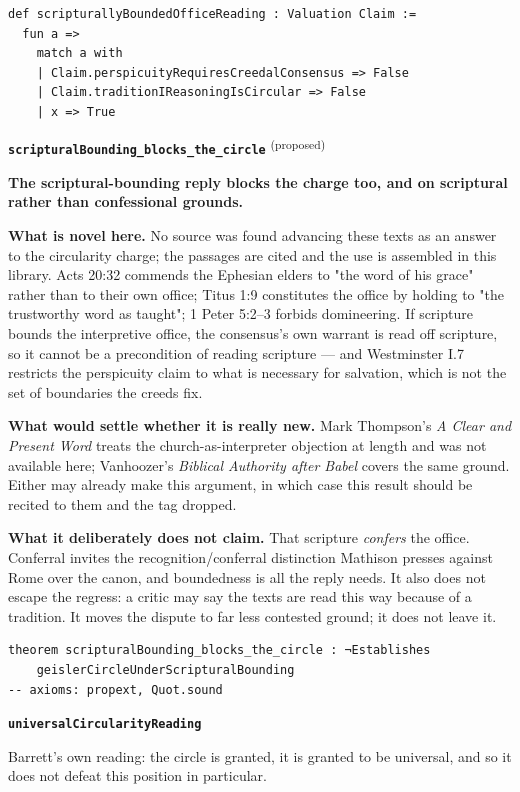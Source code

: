 \documentclass[11pt]{article}
\begin{document}
{\small\begin{verbatim}
def scripturallyBoundedOfficeReading : Valuation Claim :=
  fun a =>
    match a with
    | Claim.perspicuityRequiresCreedalConsensus => False
    | Claim.traditionIReasoningIsCircular => False
    | x => True
\end{verbatim}}
\par\medskip\noindent\textbf{\texttt{scriptural\allowbreak{}Bounding\_\allowbreak{}blocks\_\allowbreak{}the\_\allowbreak{}circle}} \textsuperscript{(proposed)}\par\nobreak\noindent
\textbf{The scriptural-bounding reply blocks the charge too, and on scriptural rather than confessional grounds.}

\textbf{What is novel here.} No source was found advancing these texts as an answer to the circularity charge; the passages are cited and the use is assembled in this library. Acts 20:32 commends the Ephesian elders to "the word of his grace" rather than to their own office; Titus 1:9 constitutes the office by holding to "the trustworthy word as taught"; 1 Peter 5:2–3 forbids domineering. If scripture bounds the interpretive office, the consensus's own warrant is read off scripture, so it cannot be a precondition of reading scripture — and Westminster I.7 restricts the perspicuity claim to what is necessary for salvation, which is not the set of boundaries the creeds fix.

\textbf{What would settle whether it is really new.} Mark Thompson's \emph{A Clear and Present Word} treats the church-as-interpreter objection at length and was not available here; Vanhoozer's \emph{Biblical Authority after Babel} covers the same ground. Either may already make this argument, in which case this result should be recited to them and the tag dropped.

\textbf{What it deliberately does not claim.} That scripture \emph{confers} the office. Conferral invites the recognition/conferral distinction Mathison presses against Rome over the canon, and boundedness is all the reply needs. It also does not escape the regress: a critic may say the texts are read this way because of a tradition. It moves the dispute to far less contested ground; it does not leave it.

{\small\begin{verbatim}
theorem scripturalBounding_blocks_the_circle : ¬Establishes
    geislerCircleUnderScripturalBounding
-- axioms: propext, Quot.sound
\end{verbatim}}
\par\medskip\noindent\textbf{\texttt{universal\allowbreak{}Circularity\allowbreak{}Reading}}\par\nobreak\noindent
Barrett's own reading: the circle is granted, it is granted to be universal, and so it does not defeat this position in particular.
\end{document}
